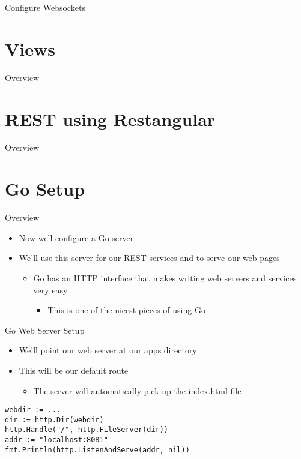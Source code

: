 \documentclass[presentation]{beamer}
\begin{document}
\begin{frame}[label=sec-3-7]{Configure Websockets}
\end{frame}

\section{Views}
\label{sec-4}
\begin{frame}[label=sec-4-1]{Overview}
\end{frame}
\section{REST using Restangular}
\label{sec-5}
\begin{frame}[label=sec-5-1]{Overview}
\end{frame}
\section{Go Setup}
\label{sec-6}
\begin{frame}[label=sec-6-1]{Overview}
\begin{itemize}
\item Now well configure a Go server
\item We'll use this server for our REST services and to serve our web pages
\begin{itemize}
\item Go has an HTTP interface that makes writing web servers and services very easy
\begin{itemize}
\item This is one of the nicest pieces of using Go
\end{itemize}
\end{itemize}
\end{itemize}
\end{frame}

\begin{frame}[fragile,label=sec-6-2]{Go Web Server Setup}
 \begin{itemize}
\item We'll point our web server at our apps directory
\item This will be our default route
\begin{itemize}
\item The server will automatically pick up the index.html file
\end{itemize}
\end{itemize}
\begin{verbatim}
webdir := ...
dir := http.Dir(webdir)
http.Handle("/", http.FileServer(dir))
addr := "localhost:8081"
fmt.Println(http.ListenAndServe(addr, nil))
\end{verbatim}
\end{frame}
\end{document}
